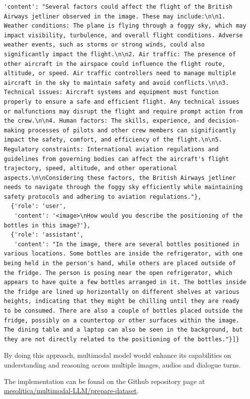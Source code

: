 \documentclass[preprint]{article}
\begin{document}
\begin{lstlisting}[breaklines=true]
   'content': "Several factors could affect the flight of the British Airways jetliner observed in the image. These may include:\n\n1. Weather conditions: The plane is flying through a foggy sky, which may impact visibility, turbulence, and overall flight conditions. Adverse weather events, such as storms or strong winds, could also significantly impact the flight.\n\n2. Air traffic: The presence of other aircraft in the airspace could influence the flight route, altitude, or speed. Air traffic controllers need to manage multiple aircraft in the sky to maintain safety and avoid conflicts.\n\n3. Technical issues: Aircraft systems and equipment must function properly to ensure a safe and efficient flight. Any technical issues or malfunctions may disrupt the flight and require prompt action from the crew.\n\n4. Human factors: The skills, experience, and decision-making processes of pilots and other crew members can significantly impact the safety, comfort, and efficiency of the flight.\n\n5. Regulatory constraints: International aviation regulations and guidelines from governing bodies can affect the aircraft's flight trajectory, speed, altitude, and other operational aspects.\n\nConsidering these factors, the British Airways jetliner needs to navigate through the foggy sky efficiently while maintaining safety protocols and adhering to aviation regulations."},
  {'role': 'user',
   'content': '<image>\nHow would you describe the positioning of the bottles in this image?'},
  {'role': 'assistant',
   'content': "In the image, there are several bottles positioned in various locations. Some bottles are inside the refrigerator, with one being held in the person's hand, while others are placed outside of the fridge. The person is posing near the open refrigerator, which appears to have quite a few bottles arranged in it. The bottles inside the fridge are lined up horizontally on different shelves at various heights, indicating that they might be chilling until they are ready to be consumed. There are also a couple of bottles placed outside the fridge, possibly on a countertop or other surfaces within the image. The dining table and a laptop can also be seen in the background, but they are not directly related to the positioning of the bottles."}]}
\end{lstlisting}

By doing this approach, multimodal model would enhance its capabilities on understanding and reasoning across multiple images, audios and dialogue turns.

The implementation can be found on the Github repository page at \href{https://github.com/mesolitica/multimodal-LLM/tree/master/prepare-dataset}{mesolitica/multimodal-LLM/prepare-dataset}.
\end{document}
